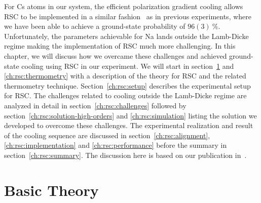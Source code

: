 For Cs atoms in our system, the efficient polarization gradient cooling
allows RSC to be implemented in a similar fashion~\cite{liu_molecular_2019}
as in previous experiments,
where we have been able to achieve a ground-state probability of $96(3)~\mathrm{\%}$.
Unfortunately, the parameters achievable for Na lands outside the Lamb-Dicke regime
making the implementation of RSC much more challenging.
In this chapter, we will discuss how we overcame these challenges
and achieved ground-state cooling using RSC in our experiment.
We will start in section~\ref{ch:rsc:basic-theory} and \ref{ch:rsc:thermometry}
with a description of the theory for RSC and the related thermometry technique.
Section~\ref{ch:rsc:setup} describes the experimental setup for RSC.
The challenges related to cooling outside the Lamb-Dicke regime are analyzed in detail
in section~\ref{ch:rsc:challenges} followed by
section~\ref{ch:rsc:solution-high-orders} and \ref{ch:rsc:simulation}
listing the solution we developed to overcome these challenges.
The experimental realization and result of the cooling sequence
are discussed in section~\ref{ch:rsc:alignment}, \ref{ch:rsc:implementation}
and \ref{ch:rsc:performance} before the summary in section~\ref{ch:rsc:summary}.
The discussion here is based on our publication in~\cite{yu_motional-ground-state_2018}.

\section{Basic Theory}
\label{ch:rsc:basic-theory}

